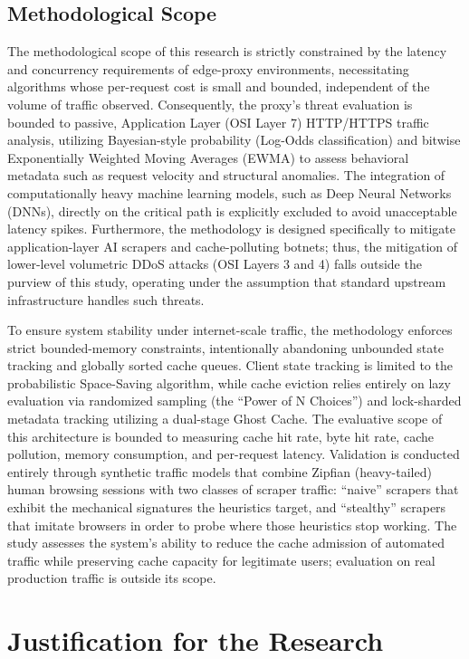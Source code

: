 \subsection{Methodological Scope}
The methodological scope of this research is strictly constrained by the latency and concurrency requirements of edge-proxy environments, necessitating algorithms whose per-request cost is small and bounded, independent of the volume of traffic observed. Consequently, the proxy's threat evaluation is bounded to passive, Application Layer (OSI Layer 7) HTTP/HTTPS traffic analysis, utilizing Bayesian-style probability (Log-Odds classification) and bitwise Exponentially Weighted Moving Averages (EWMA) to assess behavioral metadata such as request velocity and structural anomalies. The integration of computationally heavy machine learning models, such as Deep Neural Networks (DNNs), directly on the critical path is explicitly excluded to avoid unacceptable latency spikes. Furthermore, the methodology is designed specifically to mitigate application-layer AI scrapers and cache-polluting botnets; thus, the mitigation of lower-level volumetric DDoS attacks (OSI Layers 3 and 4) falls outside the purview of this study, operating under the assumption that standard upstream infrastructure handles such threats.

To ensure system stability under internet-scale traffic, the methodology enforces strict bounded-memory constraints, intentionally abandoning unbounded state tracking and globally sorted cache queues. Client state tracking is limited to the probabilistic Space-Saving algorithm, while cache eviction relies entirely on lazy evaluation via randomized sampling (the ``Power of N Choices'') and lock-sharded metadata tracking utilizing a dual-stage Ghost Cache. The evaluative scope of this architecture is bounded to measuring cache hit rate, byte hit rate, cache pollution, memory consumption, and per-request latency. Validation is conducted entirely through synthetic traffic models that combine Zipfian (heavy-tailed) human browsing sessions with two classes of scraper traffic: ``naive'' scrapers that exhibit the mechanical signatures the heuristics target, and ``stealthy'' scrapers that imitate browsers in order to probe where those heuristics stop working. The study assesses the system's ability to reduce the cache admission of automated traffic while preserving cache capacity for legitimate users; evaluation on real production traffic is outside its scope.

\section{Justification for the Research}

